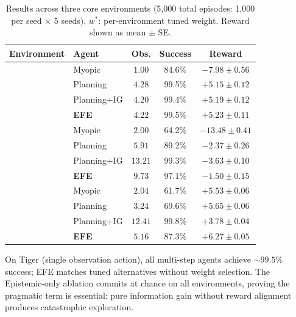 \documentclass[runningheads]{llncs}
\begin{document}
\begin{table}[ht]
\centering
\caption{Results across three core environments (5{,}000 total episodes: 1{,}000 per seed $\times$ 5 seeds). $w^*$: per-environment tuned weight. Reward shown as mean $\pm$ SE.}
\label{tab:main}
\begin{small}
\begin{tabular}{llccc}
\toprule
Environment & Agent & Obs. & Success & Reward \\
\midrule
{} & Myopic & $1.00$ & 84.6\% & $-7.98 \pm 0.56$ \\
& Planning & $4.28$ & 99.5\% & $+5.15 \pm 0.12$ \\
& Planning+IG & $4.20$ & 99.4\% & $+5.19 \pm 0.12$ \\
& \textbf{EFE} & $\mathbf{4.22}$ & $\mathbf{99.5\%}$ & $\mathbf{+5.23 \pm 0.11}$ \\
\midrule
{} & Myopic & $2.00$ & 64.2\% & $-13.48 \pm 0.41$ \\
& Planning & $5.91$ & 89.2\% & $-2.37 \pm 0.26$ \\
& Planning+IG & $13.21$ & 99.3\% & $-3.63 \pm 0.10$ \\
& \textbf{EFE} & $\mathbf{9.73}$ & $\mathbf{97.1\%}$ & $\mathbf{-1.50 \pm 0.15}$ \\
\midrule
{} & Myopic & $2.04$ & 61.7\% & $+5.53 \pm 0.06$ \\
& Planning & $3.24$ & 69.6\% & $+5.65 \pm 0.06$ \\
& Planning+IG & $12.41$ & 99.8\% & $+3.78 \pm 0.04$ \\
& \textbf{EFE} & $\mathbf{5.16}$ & $\mathbf{87.3\%}$ & $\mathbf{+6.27 \pm 0.05}$ \\
\bottomrule
\end{tabular}
\end{small}
\end{table}

On Tiger (single observation action), all multi-step agents achieve ${\sim}99.5\%$ success; EFE matches tuned alternatives without weight selection. The Epistemic-only ablation commits at chance on all environments, proving the pragmatic term is essential: pure information gain without reward alignment produces catastrophic exploration.
\end{document}
